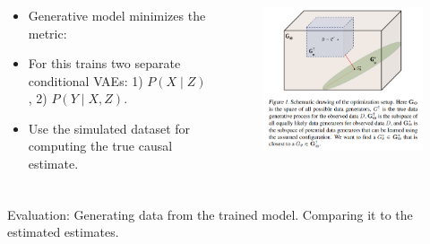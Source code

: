 \documentclass{beamer}
\begin{document}
\begin{frame}
	\frametitle{}
	\begin{columns}
		\begin{column}{0.5 \textwidth}
			\begin{itemize}
				\item Generative model minimizes the metric: 
				\item For this trains two separate conditional VAEs: 1) $P(X \mid Z) $, 2) $ P(Y \mid X, Z) $.
				\item Use the simulated dataset for computing the true causal estimate.
			\end{itemize}
		\end{column}
		\begin{column}{0.5 \textwidth}
			\begin{figure}
				\includegraphics[scale=0.45]{imgs/distributions.png}
			\end{figure}
		\end{column}
	\end{columns}
\end{frame}

\begin{frame}
	\frametitle{}
% 
	Evaluation:
	Generating data from the trained model.
	Comparing it to the estimated estimates.
\end{frame}
\end{document}

